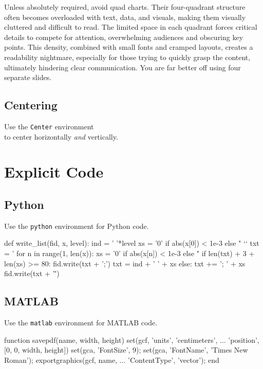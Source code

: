 \documentclass{sysubeamer}
\begin{document}
{    \hspace{0.6cm}
    \parbox{0.8\textwidth}{\tiny%
    Unless absolutely required, avoid quad charts. Their four-quadrant structure often becomes overloaded with text, data, and visuals, making them visually cluttered and difficult to read. The limited space in each quadrant forces critical details to compete for attention, overwhelming audiences and obscuring key points. This density, combined with small fonts and cramped layouts, creates a readability nightmare, especially for those trying to quickly grasp the content, ultimately hindering clear communication. You are far better off using four separate slides.}
}

\section{Centering}

\begin{Center}
    \Large Use the \texttt{Center} environment \\
    to center horizontally \emph{and} vertically.
\end{Center}

\chapter{Explicit Code}

\section{Python}\onecolumn

Use the \verb|python| environment for Python code.
\begin{python}
def write_list(fid, x, level):
    ind = '  '*level
    xs = '0' if abs(x[0]) < 1e-3 else "%
`\HL`    txt = '\n%
    for n in range(1, len(x)):
        xs = '0' if abs(x[n]) < 1e-3 else "%
        if len(txt) + 3 + len(xs) >= 80:
            fid.write(txt + ';\n')
            txt = ind + '  ' + xs
        else:
            txt += '; ' + xs
    fid.write(txt + '\"')
\end{python}

\section{MATLAB}

Use the \verb|matlab| environment for MATLAB code.
\begin{matlab}
function savepdf(name, width, height)
    set(gcf, 'units', 'centimeters', ...
        'position', [0, 0, width, height])
    set(gca, 'FontSize', 9);
    set(gca, 'FontName', 'Times New Roman');
    exportgraphics(gcf, name, ...
        'ContentType', 'vector');
end
\end{matlab}
\end{document}

